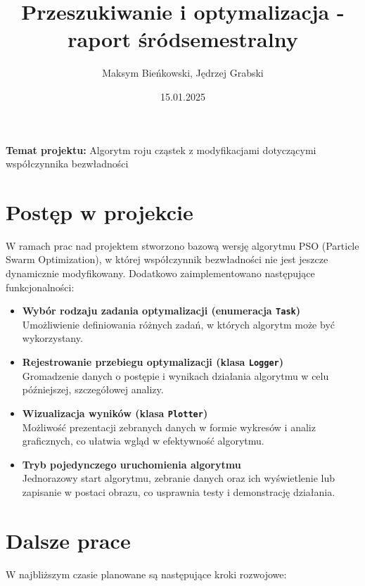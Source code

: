 \documentclass[12pt]{article}
\title{Przeszukiwanie i optymalizacja - raport śródsemestralny}
\author{Maksym Bieńkowski, Jędrzej Grabski}
\date{15.01.2025}
\begin{document}
\maketitle
\begin{centering}
	\textbf{Temat projektu: }Algorytm roju cząstek z modyfikacjami dotyczącymi współczynnika bezwładności
\end{centering}

\section*{Postęp w projekcie}

W ramach prac nad projektem stworzono bazową wersję algorytmu PSO (Particle Swarm Optimization), w której współczynnik bezwładności nie jest jeszcze dynamicznie modyfikowany. Dodatkowo zaimplementowano następujące funkcjonalności:

\begin{itemize}
	\item \textbf{Wybór rodzaju zadania optymalizacji (enumeracja \texttt{Task})} \\
	      Umożliwienie definiowania różnych zadań, w których algorytm może być wykorzystany.

	\item \textbf{Rejestrowanie przebiegu optymalizacji (klasa \texttt{Logger})} \\
	      Gromadzenie danych o postępie i wynikach działania algorytmu w celu późniejszej, szczegółowej analizy.

	\item \textbf{Wizualizacja wyników (klasa \texttt{Plotter})} \\
	      Możliwość prezentacji zebranych danych w formie wykresów i analiz graficznych, co ułatwia wgląd w efektywność algorytmu.

	\item \textbf{Tryb pojedynczego uruchomienia algorytmu} \\
	      Jednorazowy start algorytmu, zebranie danych oraz ich wyświetlenie lub zapisanie w postaci obrazu, co usprawnia testy i demonstrację działania.
\end{itemize}

\section*{Dalsze prace}

W najbliższym czasie planowane są następujące kroki rozwojowe:
\end{document}
